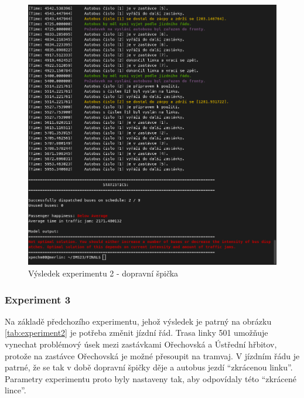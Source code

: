 \documentclass[a4paper]{article}
\begin{document}
                \begin{figure}[H]
                \includegraphics[scale=0.48, keepaspectratio]{fig/ims_bus2.png}
                \caption{Výsledek experimentu 2 - dopravní špička}
                \label{fig:experiment2}
            \end{figure}
    \newpage
            \subsubsection{Experiment 3}
            \label{subsubsec:experiment3}

				Na základě předchozího experimentu, jehož výsledek je patrný na obrázku \ref{tab:experiment2} je potřeba změnit jízdní řád. Trasa linky 501 umožňuje vynechat problémový úsek mezi zastávkami Ořechovská a Ústřední hřbitov, protože na zastávce Ořechovská je možné přesoupit na tramvaj.
                V jízdním řádu \cite{Jizdni_rad} je patrné, že se tak v době dopravní špičky děje a autobus jezdí \enquote{zkrácenou linku}. Parametry experimentu proto byly nastaveny tak, aby odpovídaly této \enquote{zkrácené lince}.
                
\end{document}
